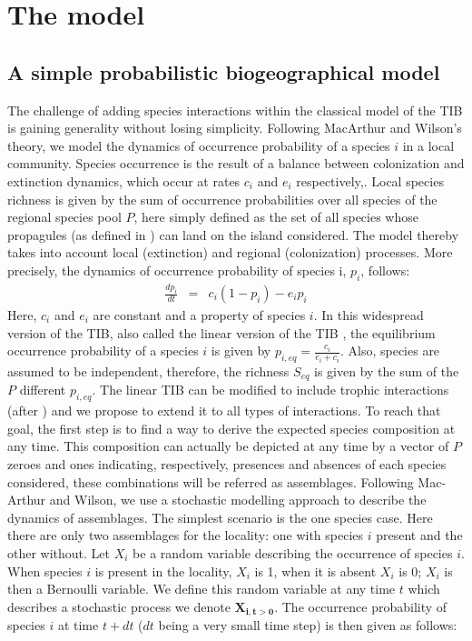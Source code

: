 \section{The model}

\subsection{A simple probabilistic biogeographical model}

The challenge of adding species interactions within the classical model of the TIB is gaining generality without losing simplicity. Following MacArthur and Wilson's theory, we model the dynamics of occurrence probability of a species $i$ in a local community. Species occurrence is the result of a balance between colonization and extinction dynamics, which occur at rates $c_i$ and $e_i$ respectively,. Local species richness is given by the sum of occurrence probabilities over all species of the regional species pool $P$, here simply defined as the set of all species whose propagules (as defined in \citep{Simberloff1969Experimental}) can land on the island considered. The model thereby takes into account local (extinction) and regional (colonization) processes. More precisely, the dynamics of occurrence probability of species i, $p_i$, follows:
\begin{eqnarray}
\label{eq1} \frac{dp_{i}}{dt}&=&c_i(1-p_{i})-e_ip_{i}
\end{eqnarray}
Here, $c_i$ and $e_i$ are constant and a property of species $i$. In this widespread version of the TIB, also called the linear version of the TIB \citep{Schoener2010MacarthurWilson}, the equilibrium occurrence probability of a species $i$ is given by $p_{i,eq}=\frac{c_i}{e_i+c_i}$. Also, species are assumed to be independent, therefore, the richness $S_{eq}$ is given by the sum of the $P$ different $p_{i,eq}$. The linear TIB can be modified to include trophic interactions (after \citep{Gravel2011Trophic}) and we propose to extend it to all types of interactions. To reach that goal, the first step is to find a way to derive the expected species composition at any time. This composition can actually be depicted at any time by a vector of $P$ zeroes and ones indicating, respectively, presences and absences of each species considered, these combinations will be referred as assemblages. Following Mac-Arthur and Wilson, we use a stochastic modelling approach to describe the dynamics of assemblages. The simplest scenario is the one species case. Here there are only two assemblages for the locality: one with species $i$ present and the other without. Let $X_{i}$ be a random variable describing the occurrence of species $i$. When species $i$ is present in the locality, $X_i$ is 1, when it is absent $X_i$ is 0; $X_i$ is then a Bernoulli variable. We define this random variable at any time $t$ which describes a stochastic process we denote $\mathbf{X_{i,t>0}}$. The occurrence probability of species $i$ at time $t+dt$ ($dt$ being a very small time step) is then given as follows:
